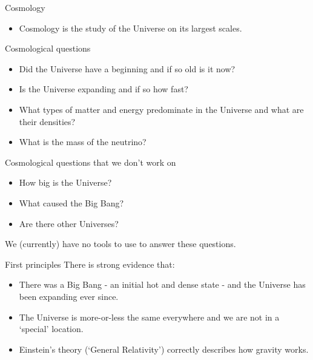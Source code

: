 \documentclass[usenames,dvipsnames]{beamer}
\begin{document}
\begin{frame}{Cosmology}
  \begin{block}{}
    \begin{itemize}
      \item{Cosmology is the study of the Universe on its largest scales.}
    \end{itemize}
  \end{block}
\end{frame}

\begin{frame}{Cosmological questions}
  \begin{block}{}
    \begin{itemize}
      \item{Did the Universe have a beginning and if so old is it now?}
      \item{Is the Universe expanding and if so how fast?}
      \item{What types of matter and energy predominate in the Universe and what are their densities?}
      \item{What is the mass of the neutrino?}
    \end{itemize}
  \end{block}
\end{frame}

\begin{frame}{Cosmological questions that we don't work on}
  \begin{block}{}
    \begin{itemize}
      \item{How big is the Universe?}
      \item{What caused the Big Bang?}
      \item{Are there other Universes?}
    \end{itemize}
    We (currently) have no tools to use to answer these questions.
  \end{block}
\end{frame}


\begin{frame}{First principles}
  There is strong evidence that:
  \begin{block}{}
    \begin{itemize}
      \item{There was a Big Bang - an initial hot and dense state - and the Universe has been expanding ever since.}
      \item{The Universe is more-or-less the same everywhere and we are not in a `special' location.}
      \item{Einstein's theory (`General Relativity') correctly describes how gravity works.}
    \end{itemize}
  \end{block}
\end{frame}
\end{document}
